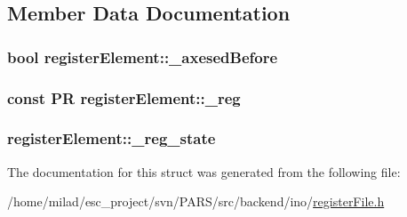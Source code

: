 \subsection{Member Data Documentation}
\hypertarget{structregisterElement_a62ca0df1f9f090ad0077ecd55d736009}{
\subsubsection[{\_\-axesedBefore}]{\setlength{\rightskip}{0pt plus 5cm}bool {\bf registerElement::\_\-axesedBefore}}}
\label{structregisterElement_a62ca0df1f9f090ad0077ecd55d736009}
\hypertarget{structregisterElement_a4693e64de38fe55ae199c92f246ac518}{
\subsubsection[{\_\-reg}]{\setlength{\rightskip}{0pt plus 5cm}const {\bf PR} {\bf registerElement::\_\-reg}}}
\label{structregisterElement_a4693e64de38fe55ae199c92f246ac518}
\hypertarget{structregisterElement_ac9fe8172b609245e132ba12a0ea815ba}{
\subsubsection[{\_\-reg\_\-state}]{ {\bf registerElement::\_\-reg\_\-state}}}
\label{structregisterElement_ac9fe8172b609245e132ba12a0ea815ba}


The documentation for this struct was generated from the following file:\begin{DoxyCompactItemize}
\item 
/home/milad/esc\_\-project/svn/PARS/src/backend/ino/\hyperlink{registerFile_8h}{registerFile.h}\end{DoxyCompactItemize}
